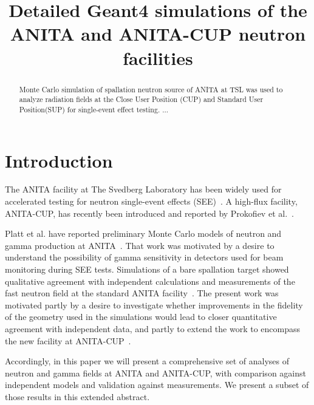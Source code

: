 \documentclass[peerreviewca,11pt,a4paper]{IEEEtran}
\begin{document}
\title{
    Detailed Geant4 simulations of the ANITA and ANITA-CUP neutron facilities
}

\author{
}

\maketitle

\begin{abstract}
    Monte Carlo simulation of spallation neutron source of ANITA at TSL was used to analyze radiation fields at the Close User Position (CUP) and Standard User Position(SUP) for single-event effect testing. ...
\end{abstract}

\IEEEpeerreviewmaketitle

\section{Introduction}

The ANITA facility at The Svedberg Laboratory has been widely used for accelerated testing for neutron single-event effects (SEE)~\cite{Prokofiev2009}.
A high-flux facility, ANITA-CUP, has recently been introduced and reported by Prokofiev et al.~\cite{Prokofiev2014}.

Platt et al. have reported preliminary Monte Carlo models of neutron and gamma production at ANITA~\cite{Platt2013}.
That work was motivated by a desire to understand the possibility of gamma sensitivity in detectors used for beam monitoring during SEE tests.
Simulations of a bare spallation target showed qualitative agreement with independent calculations and measurements of the fast neutron field at the standard ANITA facility~\cite{Prokofiev2009}.
The present work was motivated partly by a desire to investigate whether improvements in the fidelity of the geometry used in the simulations would lead to closer quantitative agreement with independent data, and partly to extend the work to encompass the new facility at ANITA-CUP~\cite{Prokofiev2014}.

Accordingly, in this paper we will present a comprehensive set of analyses of neutron and gamma fields at ANITA and ANITA-CUP, with comparison against independent models and validation against measurements.
We present a subset of those results in this extended abstract.
\end{document}
